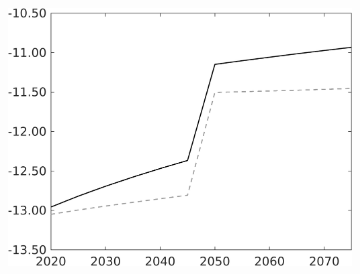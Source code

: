 \begin{figure}[h!!]
\begin{subfigure}[]{0.4\textwidth}
	\includegraphics[width=1\textwidth]{../../codding_model/own_basedOnFried/optimalPol_010922_revision/figures/all_13Sept22/CompTaufPER_bytaul_KN_Reg5_GFF_spillover0_nsk0_xgr0_knspil0_sep0_LFlimit1_emsbase0_countec0_GovRev0_etaa0.79_lgd0.png}
\end{subfigure}	


\end{figure}

